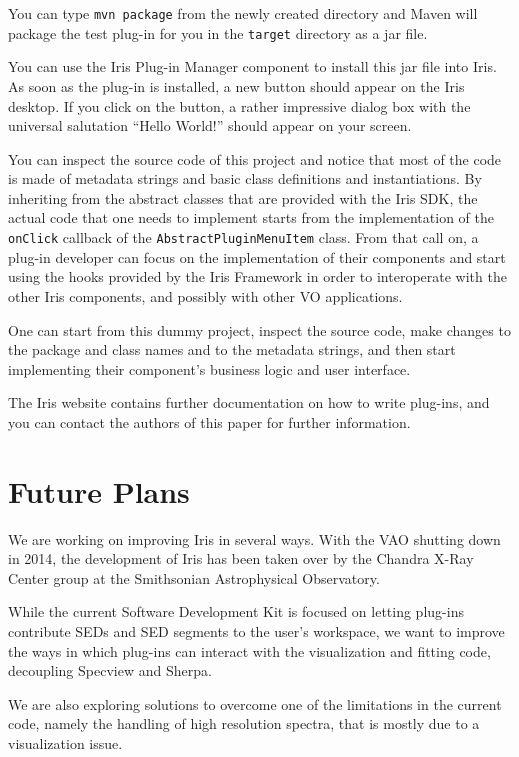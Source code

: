 \documentclass[preprint,authoryear,5p]{elsarticle}
\begin{document}
You can type \verb|mvn package| from the newly created directory and Maven will
package the test plug-in for you in the \verb|target| directory as a jar file.

You can use the Iris Plug-in Manager component to install this jar file into
Iris. As soon as the plug-in is installed, a new button should appear on the Iris desktop. If
you click on the button, a rather impressive dialog box with the universal salutation
``Hello World!'' should appear on your screen.

You can inspect the source code of this project and notice that most of the code is
made of metadata strings and basic class definitions and instantiations. By
inheriting from the abstract classes that are provided with the Iris SDK, the
actual code that one needs to implement starts from the implementation of the
\verb|onClick| callback of the \verb|AbstractPluginMenuItem| class. From that call on,
a plug-in developer can focus on the implementation of their components and
start using the hooks provided by the Iris Framework in order to interoperate
with the other Iris components, and possibly with other VO applications.

One can start from this dummy project, inspect the source code, make changes to
the package and class names and to the metadata strings, and then start
implementing their component's business logic and user interface.

The Iris website contains further documentation on how to write plug-ins, and
you can contact the authors of this paper for further information.

\section{Future Plans} We are working on improving Iris in several ways. With
the VAO shutting down in 2014, the development of Iris has been taken over by
the Chandra X-Ray Center group at the Smithsonian Astrophysical Observatory.

While the current Software Development Kit is focused on letting plug-ins
contribute SEDs and SED segments to the user's workspace, we want to improve the
ways in which plug-ins can interact with the visualization and fitting code,
decoupling Specview and Sherpa.

We are also exploring solutions to overcome one of the limitations in the
current code, namely the handling of high resolution spectra, that is mostly due
to a visualization issue.
\end{document}
